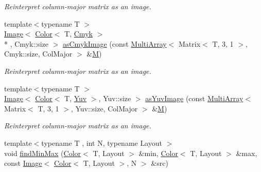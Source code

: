\begin{DoxyCompactItemize}
\begin{DoxyCompactList}\small\item\em Reinterpret column-\/major matrix as an image. \end{DoxyCompactList}\item 
\hypertarget{group___image_ga03047b50e8796b06624fbd45ac3c46ec}{{\footnotesize template$<$typename T $>$ }\\\hyperlink{class_d_o_1_1_image}{Image}$<$ \hyperlink{class_d_o_1_1_color}{Color}$<$ T, \hyperlink{group___color_space_ga3d376efd2059bb15b8fd696946e051ff}{Cmyk} $>$\\*
, Cmyk\-::size $>$ \hyperlink{group___image_ga03047b50e8796b06624fbd45ac3c46ec}{as\-Cmyk\-Image} (const \hyperlink{class_d_o_1_1_multi_array}{Multi\-Array}$<$ Matrix$<$ T, 3, 1 $>$, Cmyk\-::size, Col\-Major $>$ \&\hyperlink{struct_d_o_1_1_m}{M})}\label{group___image_ga03047b50e8796b06624fbd45ac3c46ec}

\begin{DoxyCompactList}\small\item\em Reinterpret column-\/major matrix as an image. \end{DoxyCompactList}\item 
\hypertarget{group___image_gac9273f843fb0d04b3be0c254e920896b}{{\footnotesize template$<$typename T $>$ }\\\hyperlink{class_d_o_1_1_image}{Image}$<$ \hyperlink{class_d_o_1_1_color}{Color}$<$ T, \hyperlink{group___color_space_ga8d04b5aa0ecd455aa29da0987b106ad0}{Yuv} $>$, Yuv\-::size $>$ \hyperlink{group___image_gac9273f843fb0d04b3be0c254e920896b}{as\-Yuv\-Image} (const \hyperlink{class_d_o_1_1_multi_array}{Multi\-Array}$<$ Matrix$<$ T, 3, 1 $>$, Yuv\-::size, Col\-Major $>$ \&\hyperlink{struct_d_o_1_1_m}{M})}\label{group___image_gac9273f843fb0d04b3be0c254e920896b}

\begin{DoxyCompactList}\small\item\em Reinterpret column-\/major matrix as an image. \end{DoxyCompactList}\item 
\hypertarget{group___image_ga21de6940367133734d08916371bdf437}{{\footnotesize template$<$typename T , int N, typename Layout $>$ }\\void \hyperlink{group___image_ga21de6940367133734d08916371bdf437}{find\-Min\-Max} (\hyperlink{class_d_o_1_1_color}{Color}$<$ T, Layout $>$ \&min, \hyperlink{class_d_o_1_1_color}{Color}$<$ T, Layout $>$ \&max, const \hyperlink{class_d_o_1_1_image}{Image}$<$ \hyperlink{class_d_o_1_1_color}{Color}$<$ T, Layout $>$, N $>$ \&src)}\label{group___image_ga21de6940367133734d08916371bdf437}


\end{DoxyCompactItemize}

